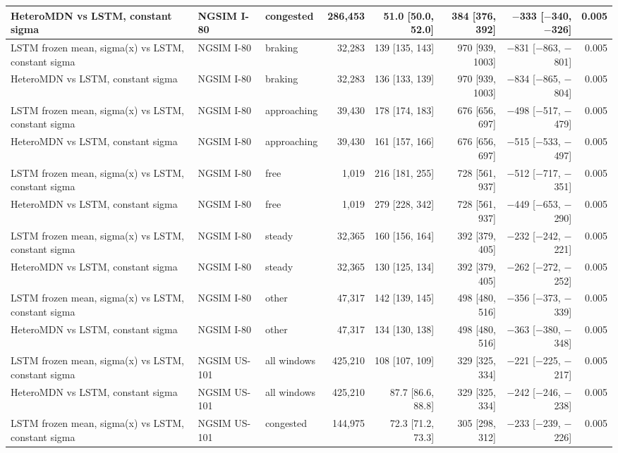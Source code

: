 \begin{longtable}{lllrrrrr}
\midrule
HeteroMDN vs LSTM, constant sigma & NGSIM I-80 & congested & 286,453 & 51.0 [50.0, 52.0] & 384 [376, 392] & $-$333 [$-$340, $-$326] & 0.005 \\
\midrule
LSTM frozen mean, sigma(x) vs LSTM, constant sigma & NGSIM I-80 & braking & 32,283 & 139 [135, 143] & 970 [939, 1003] & $-$831 [$-$863, $-$801] & 0.005 \\
\midrule
HeteroMDN vs LSTM, constant sigma & NGSIM I-80 & braking & 32,283 & 136 [133, 139] & 970 [939, 1003] & $-$834 [$-$865, $-$804] & 0.005 \\
\midrule
LSTM frozen mean, sigma(x) vs LSTM, constant sigma & NGSIM I-80 & approaching & 39,430 & 178 [174, 183] & 676 [656, 697] & $-$498 [$-$517, $-$479] & 0.005 \\
\midrule
HeteroMDN vs LSTM, constant sigma & NGSIM I-80 & approaching & 39,430 & 161 [157, 166] & 676 [656, 697] & $-$515 [$-$533, $-$497] & 0.005 \\
\midrule
LSTM frozen mean, sigma(x) vs LSTM, constant sigma & NGSIM I-80 & free & 1,019 & 216 [181, 255] & 728 [561, 937] & $-$512 [$-$717, $-$351] & 0.005 \\
\midrule
HeteroMDN vs LSTM, constant sigma & NGSIM I-80 & free & 1,019 & 279 [228, 342] & 728 [561, 937] & $-$449 [$-$653, $-$290] & 0.005 \\
\midrule
LSTM frozen mean, sigma(x) vs LSTM, constant sigma & NGSIM I-80 & steady & 32,365 & 160 [156, 164] & 392 [379, 405] & $-$232 [$-$242, $-$221] & 0.005 \\
\midrule
HeteroMDN vs LSTM, constant sigma & NGSIM I-80 & steady & 32,365 & 130 [125, 134] & 392 [379, 405] & $-$262 [$-$272, $-$252] & 0.005 \\
\midrule
LSTM frozen mean, sigma(x) vs LSTM, constant sigma & NGSIM I-80 & other & 47,317 & 142 [139, 145] & 498 [480, 516] & $-$356 [$-$373, $-$339] & 0.005 \\
\midrule
HeteroMDN vs LSTM, constant sigma & NGSIM I-80 & other & 47,317 & 134 [130, 138] & 498 [480, 516] & $-$363 [$-$380, $-$348] & 0.005 \\
\midrule
LSTM frozen mean, sigma(x) vs LSTM, constant sigma & NGSIM US-101 & all windows & 425,210 & 108 [107, 109] & 329 [325, 334] & $-$221 [$-$225, $-$217] & 0.005 \\
\midrule
HeteroMDN vs LSTM, constant sigma & NGSIM US-101 & all windows & 425,210 & 87.7 [86.6, 88.8] & 329 [325, 334] & $-$242 [$-$246, $-$238] & 0.005 \\
\midrule
LSTM frozen mean, sigma(x) vs LSTM, constant sigma & NGSIM US-101 & congested & 144,975 & 72.3 [71.2, 73.3] & 305 [298, 312] & $-$233 [$-$239, $-$226] & 0.005 \\

\end{longtable}
